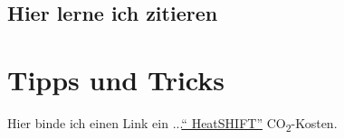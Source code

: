 \section{Hier lerne ich zitieren}
	\label{sec:zitieren}
	
	
\chapter{Tipps und Tricks}
	\label{chap:tipps}
	
Hier binde ich einen Link ein ...\href{https://forschung.hs-kempten.de/de/forschungsprojekt/482-heatshift}{\enquote{ HeatSHIFT}}
CO\textsubscript{2}-Kosten.
